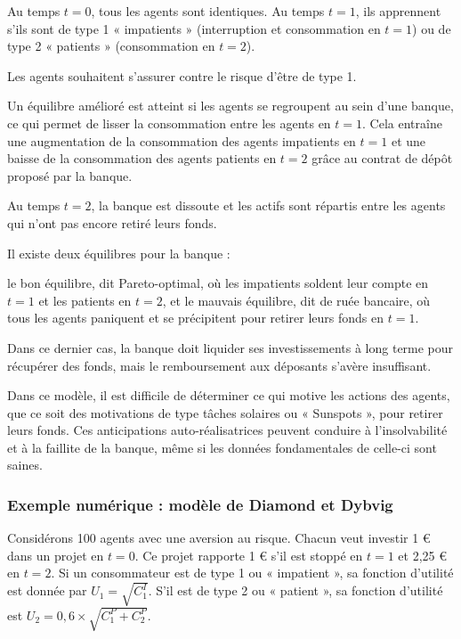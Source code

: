\documentclass[a4paper, 12pt]{report}
\begin{document}
Au temps \( t=0 \), tous les agents sont identiques. Au temps \( t=1 \), ils apprennent s'ils sont de type 1 « impatients » (interruption et consommation en \( t=1 \)) ou de type 2 « patients » (consommation en \( t=2 \)). 

Les agents souhaitent s'assurer contre le risque d'être de type 1. 

Un équilibre amélioré est atteint si les agents se regroupent au sein d'une banque, ce qui permet de lisser la consommation entre les agents en \( t=1 \). Cela entraîne une augmentation de la consommation des agents impatients en \( t=1 \) et une baisse de la consommation des agents patients en \( t=2 \) grâce au contrat de dépôt proposé par la banque. 

Au temps \( t=2 \), la banque est dissoute et les actifs sont répartis entre les agents qui n'ont pas encore retiré leurs fonds. 

Il existe deux équilibres pour la banque : 


le bon équilibre, dit Pareto-optimal, où les impatients soldent leur compte en \( t=1 \) et les patients en \( t=2 \), et le mauvais équilibre, dit de ruée bancaire, où tous les agents paniquent et se précipitent pour retirer leurs fonds en \( t=1 \).

Dans ce dernier cas, la banque doit liquider ses investissements à long terme pour récupérer des fonds, mais le remboursement aux déposants s'avère insuffisant.

Dans ce modèle, il est difficile de déterminer ce qui motive les actions des agents, que ce soit des motivations de type tâches solaires ou « Sunspots », pour retirer leurs fonds. Ces anticipations auto-réalisatrices peuvent conduire à l'insolvabilité et à la faillite de la banque, même si les données fondamentales de celle-ci sont saines.

\subsubsection{Exemple numérique : modèle de Diamond et Dybvig}

Considérons 100 agents avec une aversion au risque. Chacun veut investir 1 € dans un projet en \( t=0 \). Ce projet rapporte 1 € s'il est stoppé en \( t=1 \) et 2,25 € en \( t=2 \). Si un consommateur est de type 1 ou « impatient », sa fonction d'utilité est donnée par \( U_1 = \sqrt{C_1^I} \). S'il est de type 2 ou « patient », sa fonction d'utilité est \( U_2 = 0,6 \times \sqrt{C_1^P+C_2^P}  \).
\end{document}
